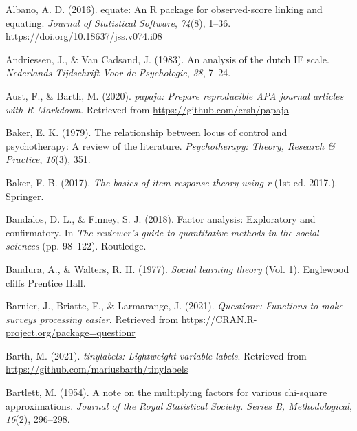 \documentclass[
  man]{apa6}
\newlength{\cslhangindent}
\newlength{\cslentryspacingunit} %
\newenvironment{CSLReferences}[2] %
 {%
  \setlength{\parindent}{0pt}
  \ifodd #1
  \let\oldpar\par
  \def\par{\hangindent=\cslhangindent\oldpar}
  \fi
  \setlength{\parskip}{#2\cslentryspacingunit}
 }%
 {}
\begin{document}
\begingroup
\setlength{\parindent}{-0.5in}
\setlength{\leftskip}{0.5in}

\hypertarget{refs}{}
\begin{CSLReferences}{1}{0}
\leavevmode{}%
Albano, A. D. (2016). {equate}: An {R} package for observed-score linking and equating. \emph{Journal of Statistical Software}, \emph{74}(8), 1--36. \url{https://doi.org/10.18637/jss.v074.i08}

\leavevmode{}%
Andriessen, J., \& Van Cadsand, J. (1983). An analysis of the dutch IE scale. \emph{Nederlands Tijdschrift Voor de Psychologic}, \emph{38}, 7--24.

\leavevmode{}%
Aust, F., \& Barth, M. (2020). \emph{{papaja}: {Prepare} reproducible {APA} journal articles with {R Markdown}}. Retrieved from \url{https://github.com/crsh/papaja}

\leavevmode{}%
Baker, E. K. (1979). The relationship between locus of control and psychotherapy: A review of the literature. \emph{Psychotherapy: Theory, Research \& Practice}, \emph{16}(3), 351.

\leavevmode{}%
Baker, F. B. (2017). \emph{The basics of item response theory using r} (1st ed. 2017.). Springer.

\leavevmode{}%
Bandalos, D. L., \& Finney, S. J. (2018). Factor analysis: Exploratory and confirmatory. In \emph{The reviewer's guide to quantitative methods in the social sciences} (pp. 98--122). Routledge.

\leavevmode{}%
Bandura, A., \& Walters, R. H. (1977). \emph{Social learning theory} (Vol. 1). Englewood cliffs Prentice Hall.

\leavevmode{}%
Barnier, J., Briatte, F., \& Larmarange, J. (2021). \emph{Questionr: Functions to make surveys processing easier}. Retrieved from \url{https://CRAN.R-project.org/package=questionr}

\leavevmode{}%
Barth, M. (2021). \emph{{tinylabels}: Lightweight variable labels}. Retrieved from \url{https://github.com/mariusbarth/tinylabels}

\leavevmode{}%
Bartlett, M. (1954). A note on the multiplying factors for various chi-square approximations. \emph{Journal of the Royal Statistical Society. Series B, Methodological}, \emph{16}(2), 296--298.


\end{CSLReferences}
\end{document}
